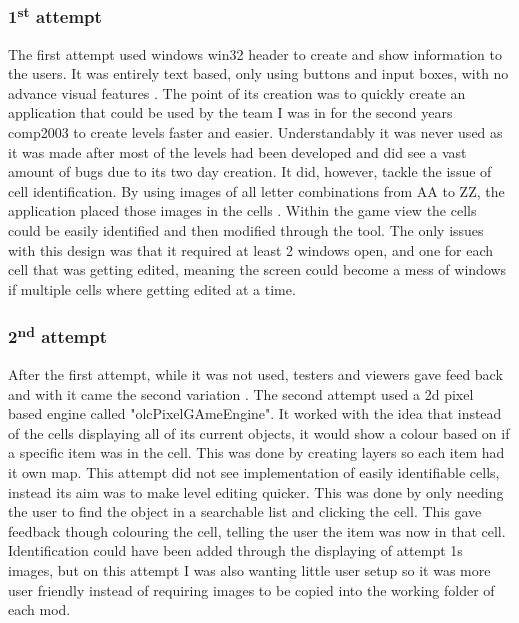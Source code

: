\subsubsection{1\textsuperscript{st} attempt}
The first attempt\cite{_2024_leveleditor} used windows win32 header to create and show information to the users. It was entirely text based, only using buttons and input boxes, with no advance visual features . The point of its creation was to quickly create an application that could be used by the team I was in for the second years comp2003 to create levels faster and easier. Understandably it was never used as it was made after most of the levels had been developed and did see a vast amount of bugs due to its two day creation. 
It did, however, tackle the issue of cell identification. By using images of all letter combinations from AA to ZZ, the application placed those images in the cells . Within the game view the cells could be easily identified and then modified through the tool. The only issues with this design was that it required at least 2 windows open, and one for each cell that was getting edited, meaning the screen could become a mess of windows if multiple cells where getting edited at a time.

\subsubsection{2\textsuperscript{nd} attempt}
After the first attempt, while it was not used, testers and viewers gave feed back and with it came the second variation\cite{ozzyking_2024_github}  . The second attempt used a 2d pixel based engine called "olcPixelGAmeEngine". It worked with the idea that instead of the cells displaying all of its current objects, it would show a colour based on if a specific item was in the cell. This was done by creating layers so each item had it own map.
This attempt did not see implementation of easily identifiable cells, instead its aim was to make level editing quicker. This was done by only needing the user to find the object in a searchable list and clicking the cell. This gave feedback though colouring the cell, telling the user the item was now in that cell. Identification could have been added through the displaying of attempt 1s images, but on this attempt I was also wanting little user setup so it was more user friendly instead of requiring images to be copied into the working folder of each mod.

